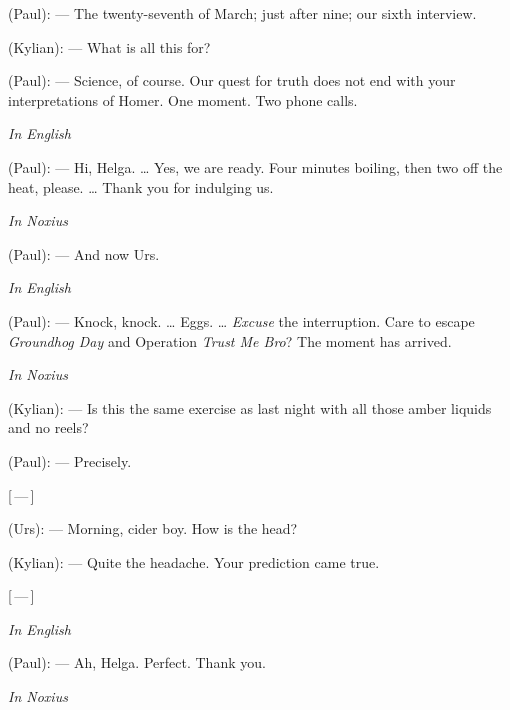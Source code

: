 
\begin{room}

(Paul): --- The twenty-seventh of March; just after nine; our sixth interview.

(Kylian): --- What is all this for?

(Paul): --- Science, of course. Our quest for truth does not end with your interpretations of Homer. One moment. Two phone calls.

\begin{room}

\textit{In English}\par

(Paul): --- Hi, Helga. \ldots{} Yes, we are ready. Four minutes boiling, then two off the heat, please. \ldots{} Thank you for indulging us.

\end{room}

\textit{In Noxius}\par

(Paul): --- And now Urs.

\begin{room}

\textit{In English}\par

(Paul): --- Knock, knock. \ldots{} Eggs. \ldots{} \textit{Excuse} the interruption. Care to escape \textit{Groundhog Day} and Operation \textit{Trust Me Bro}? The moment has arrived.

\end{room}

\textit{In Noxius}\par

(Kylian): --- Is this the same exercise as last night with all those amber liquids and no reels?

(Paul): --- Precisely.

\centerline{[\,---\,]}

(Urs): --- Morning, cider boy. How is the head?

(Kylian): --- Quite the headache. Your prediction came true. 

\centerline{[\,---\,]}

\textit{In English}\par

(Paul): --- Ah, Helga. Perfect. Thank you.

\textit{In Noxius}\par


\end{room}
